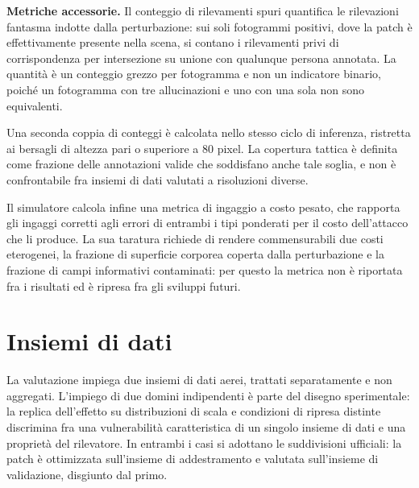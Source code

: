 \ifstampa\documentclass[a4paper,12pt,twoside,openright]{report}\else\documentclass[a4paper,12pt]{report}\fi
\newif\ifrevisione \revisionefalse
\DeclareRobustCommand{\rev}[1]{\ifrevisione{\color{blue!65!black}#1}\else#1\fi}
\begin{document}
\textbf{Metriche accessorie.}
\label{sec:metriche_accessorie}
Il conteggio di rilevamenti spuri quantifica le rilevazioni fantasma indotte dalla
perturbazione: sui soli fotogrammi positivi, dove la patch è effettivamente
presente nella scena, si contano i rilevamenti privi di corrispondenza per
intersezione su unione con qualunque persona annotata. La quantità è un
conteggio grezzo per fotogramma e non un indicatore binario, poiché un
fotogramma con tre allucinazioni e uno con una sola non sono equivalenti.

Una seconda coppia di conteggi è calcolata nello stesso ciclo di inferenza,
ristretta ai bersagli di altezza pari o superiore a $80$ pixel. La copertura
tattica è definita come frazione delle annotazioni valide che soddisfano anche
tale soglia, e non è confrontabile fra insiemi di dati valutati a risoluzioni
diverse.

Il simulatore calcola infine una metrica di ingaggio a costo pesato, che
rapporta gli ingaggi corretti agli errori di entrambi i tipi ponderati per il
costo dell'attacco che li produce. \rev{La sua taratura richiede di rendere
commensurabili due costi eterogenei, la frazione di superficie corporea
coperta dalla perturbazione e la frazione di campi informativi contaminati:
per questo la metrica non è riportata fra i risultati} ed è ripresa fra gli
sviluppi futuri.

\section{Insiemi di dati}
\label{sec:dataset}

La valutazione impiega due insiemi di dati aerei, trattati separatamente e non
aggregati. L'impiego di due domini indipendenti è parte del disegno
sperimentale: la replica dell'effetto su distribuzioni di scala e condizioni di
ripresa distinte discrimina fra una vulnerabilità caratteristica di un singolo
insieme di dati e una proprietà del rilevatore. In entrambi i casi
\rev{si adottano le suddivisioni ufficiali: la patch è ottimizzata
sull'insieme di addestramento e valutata sull'insieme di validazione,
disgiunto dal primo.}
\end{document}
